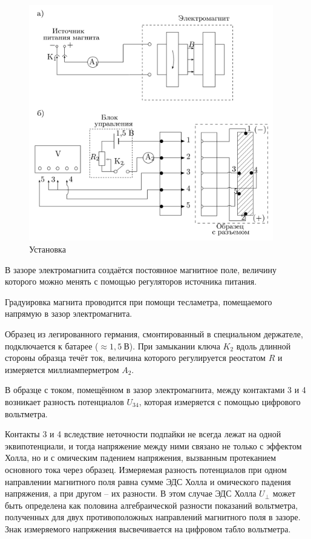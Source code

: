 \documentclass[12pt, a4paper]{article}
\begin{document}
\begin{figure}
  \centering
  \vspace{-8mm}
  \begin{center}
    \includegraphics[width=0.95\textwidth]{pics/setup}
  \end{center}
  \caption{Установка}\label{fig:setup}
\end{figure}
В зазоре электромагнита создаётся постоянное магнитное поле, величину которого можно менять с помощью регуляторов источника питания.

Градуировка магнита проводится при помощи тесламетра, помещаемого напрямую в зазор электромагнита.

Образец из легированного германия, смонтированный в специальном держателе, подключается к батарее ($\approx1,5~\text{В}$). При замыкании ключа $K_2$ вдоль длинной стороны образца течёт ток, величина которого регулируется реостатом $R$ и измеряется миллиамперметром $A_2$.

В образце с током, помещённом в зазор электромагнита, между контактами 3 и 4 возникает разность потенциалов $U_{34}$, которая измеряется с помощью цифрового вольтметра.

Контакты 3 и 4 вследствие неточности подпайки не всегда лежат на одной эквипотенциали, и тогда напряжение между ними связано не только с эффектом Холла, но и с омическим падением напряжения, вызванным протеканием основного тока через образец. Измеряемая разность потенциалов при одном направлении магнитного поля равна сумме ЭДС Холла и омического падения напряжения, а при другом -- их разности. В этом случае ЭДС Холла $U_\perp$ может быть определена как половина алгебраической разности показаний вольтметра, полученных для двух противоположных направлений магнитного поля в зазоре. Знак измеряемого напряжения высвечивается на цифровом табло вольтметра.
\end{document}
